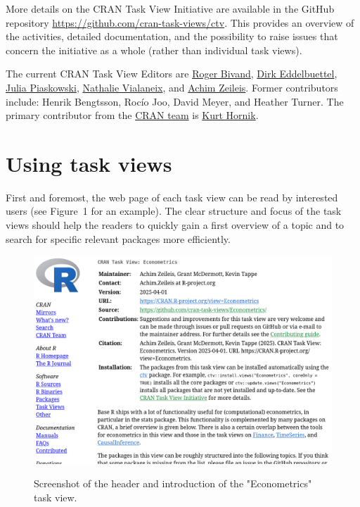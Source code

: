 More details on the CRAN Task View Initiative are available in the GitHub repository
\url{https://github.com/cran-task-views/ctv}. This provides an overview of the activities,
detailed documentation, and the possibility to raise issues that concern the initiative
as a whole (rather than individual task views).

The current CRAN Task View Editors are
\href{https://github.com/rsbivand}{Roger Bivand},
\href{https://github.com/eddelbuettel}{Dirk Eddelbuettel},
\href{https://github.com/jpiaskowski}{Julia Piaskowski},
\href{https://github.com/tuxette}{Nathalie Vialaneix}, and
\href{https://github.com/zeileis}{Achim Zeileis}.
Former contributors include: Henrik Bengtsson, Rocío Joo, David Meyer, and Heather Turner.
The primary contributor from the \href{https://CRAN.R-project.org/CRAN_team.htm}{CRAN team} is
\href{https://github.com/kurthornik}{Kurt Hornik}.

\section{Using task views}\label{using-task-views}

First and foremost, the web page of each task view can be read by interested users
(see Figure~1 for an example).
The clear structure and focus of the task views should help the readers to quickly
gain a first overview of a topic and to search for specific relevant packages
more efficiently.

\begin{figure}[t!]
\includegraphics[width=1\linewidth,alt={Screenshot of the header and introduction of the "Econometrics" task view, captured on 2025-04-01 at https://CRAN.R-project.org/view=Econometrics. The header displays the title (Econometrics), maintainers (Achim Zeileis, Grant McDermott, Kevin Tappe), contact e-mail address, version/date, URL, GitHub link, information for potential contributors, the recommended citation, and installation instructions. The introduction starts by outlining the scope and links to other related task views (Finance, TimeSeries, CausalInference).}]{figures/econometrics} \caption{Screenshot of the header and introduction of the "Econometrics" task view.}\label{fig:econometrics}
\end{figure}


